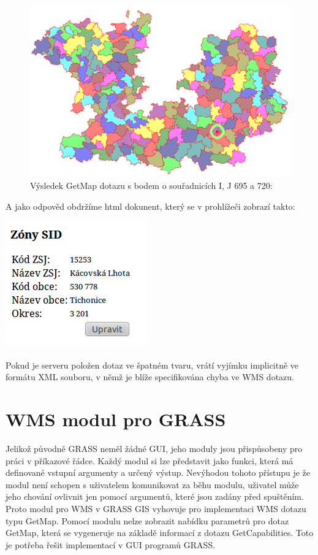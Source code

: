 \documentclass[a4paper,12pt]{article}
\begin{document}
  
\begin{figure}[h!]
 \includegraphics[scale=0.3]{figures/getfeatureinfo}
  \caption{Výsledek GetMap dotazu s bodem o souřadnicích I, J  695 a 720:}
\end{figure}

A jako odpověd obdržíme html dokunent, který se v prohlížeči zobrazí takto:

 \includegraphics[scale=0.7]{figures/getfeatureinforeply}


Pokud je serveru položen dotaz ve špatném tvaru, vrátí vyjímku implicitně ve formátu XML souboru, v němž je blíže specifikována chyba ve WMS dotazu. 


\newpage

\section{WMS modul pro GRASS}

Jelikož původně GRASS neměl žádné GUI, jeho moduly jsou přispůsobeny pro práci v příkazové řádce. Každý modul si lze představit jako funkci, která má definované vstupní argumenty a určený výstup. Nevýhodou tohoto 
přístupu je že modul není schopen s uživatelem komunikovat za běhu modulu, uživatel může jeho chování ovlivnit jen pomocí argumentů, které jsou zadány před spuštěním. Proto modul pro WMS v GRASS GIS vyhovuje pro implementaci
WMS dotazu typu GetMap. Pomocí modulu nelze zobrazit nabídku parametrů pro dotaz GetMap, která se vygeneruje na základě informací z dotazu GetCapabilities. Toto je potřeba řešit implementací v GUI programů GRASS.
\end{document}
